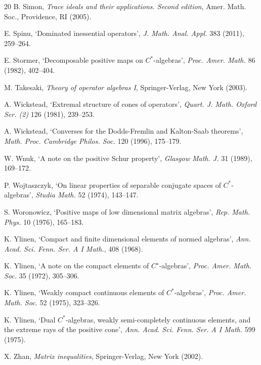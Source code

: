 \documentclass[12pt]{amsart}
\theoremstyle{plain}
\theoremstyle{definition}
\begin{document}
\begin{thebibliography}{20}
 B. Simon,
{\em Trace ideals and their applications. Second edition},
Amer. Math. Soc., Providence, RI (2005).

 E. Spinu,
`Dominated inessential operators',
{\em J. Math. Anal. Appl.} 383 (2011), 259--264.

 E. Stormer,
`Decomposable positive maps on $C^*$-algebras',
{\em Proc. Amer. Math.} 86 (1982), 402--404.


 M. Takesaki,
{\em Theory of operator algebras I},
Springer-Verlag, New York (2003).


 A. Wickstead,
`Extremal structure of cones of operators',
{\em Quart. J. Math. Oxford Ser. (2)} 126 (1981), 239--253.

 A. Wickstead,
`Converses for the Dodds-Fremlin and Kalton-Saab theorems',
{\em Math. Proc. Cambridge Philos. Soc.} 120 (1996), 175--179.

 W. Wnuk,
`A note on the positive Schur property',
{\em Glasgow Math. J.} 31 (1989), 169--172.


 P. Wojtaszczyk,
`On linear properties of separable conjugate spaces of $C^*$-algebras',
{\em Studia Math.} 52 (1974), 143--147.

 S. Woronowicz,
`Positive maps of low dimensional matrix algebras',
{\em Rep. Math. Phys.} 10 (1976), 165--183.


 K. Ylinen,
`Compact and finite dimensional elements of normed algebras',
{\em Ann. Acad. Sci. Fenn. Ser. A I Math.}, 408 (1968).

 K. Ylinen,
`A note on the compact elements of $C^∗$-algebras',
{\em Proc. Amer. Math. Soc.} 35 (1972), 305--306.

 K. Ylinen,
`Weakly compact continuous elements of $C^*$-algebras',
{\em Proc. Amer. Math. Soc.} 52 (1975), 323--326.

 K. Ylinen,
`Dual $C^*$-algebras, weakly semi-completely continuous elements,
  and the extreme rays of the positive cone',
{\em Ann. Acad. Sci. Fenn. Ser. A I Math.} 599 (1975).

 X. Zhan,
{\em Matrix inequalities},
Springer-Verlag, New York (2002).

\end{thebibliography}
\end{document}
